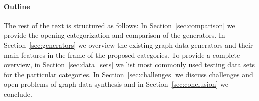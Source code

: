 

\paragraph*{Outline} The rest of the text is structured as follows:
In Section~\ref{sec:comparison} we provide the opening categorization and comparison of the generators. In Section~\ref{sec:generators} we overview the existing graph data generators and their main features in the frame of the proposed categories. To provide a complete overview, in Section~\ref{sec:data_sets} we list most commonly used testing data sets for the particular categories.  In Section~\ref{sec:challenges} we discuss challenges and open problems of graph data synthesis and in Section~\ref{sec:conclusion} we conclude.


